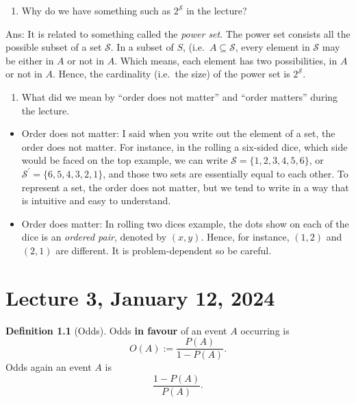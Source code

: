 \documentclass[
]{book}
\providecommand{\tightlist}{%
  \setlength{\itemsep}{0pt}\setlength{\parskip}{0pt}}
\theoremstyle{definition}
\newtheorem{definition}{Definition}[chapter]
\theoremstyle{definition}
\theoremstyle{definition}
\theoremstyle{definition}
\theoremstyle{remark}
\begin{document}
\begin{enumerate}
\def\labelenumi{\arabic{enumi}.}
\setcounter{enumi}{1}
\tightlist
\item
  Why do we have something such as \(2^\mathcal{S}\) in the lecture?
\end{enumerate}

Ans: It is related to something called the \emph{power set}. The power set consists all the possible subset of a set \(\mathcal{S}\). In a subset of \(S\), (i.e.~\(A \subseteq \mathcal{S}\), every element in \(\mathcal{S}\) may be either in \(A\) or not in \(A\). Which means, each element has two possibilities, in \(A\) or not in \(A\). Hence, the cardinality (i.e.~the size) of the power set is \(2^\mathcal{S}\).

\begin{enumerate}
\def\labelenumi{\arabic{enumi}.}
\setcounter{enumi}{2}
\tightlist
\item
  What did we mean by ``order does not matter'' and ``order matters'' during the lecture.
\end{enumerate}

\begin{itemize}
\item
  Order does not matter: I said when you write out the element of a set, the order does not matter. For instance, in the rolling a six-sided dice, which side would be faced on the top example, we can write \(\mathcal{S} = \{1,2,3,4,5,6\}\), or \(\mathcal{S}^\prime=\{6,5,4,3,2,1\}\), and those two sets are essentially equal to each other. To represent a set, the order does not matter, but we tend to write in a way that is intuitive and easy to understand.
\item
  Order does matter: In rolling two dices example, the dots show on each of the dice is an \emph{ordered pair}, denoted by \((x,y)\). Hence, for instance, \((1,2)\) and \((2,1)\) are different. It is problem-dependent so be careful.
\end{itemize}

\hypertarget{lecture-3-january-12-2024}{%
\chapter{Lecture 3, January 12, 2024}\label{lecture-3-january-12-2024}}

\begin{definition}[Odds]
Odds \textbf{in favour} of an event \(A\) occurring is
\[
  O(A) := \frac{P(A)}{1-P(A)}.
\]
Odds again an event \(A\) is
\[
  \frac{1-P(A)}{P(A)}.
\]
\end{definition}
\end{document}
